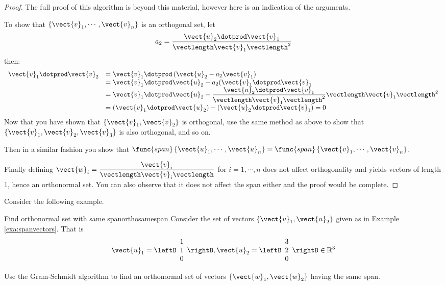 \begin{proof}
The full proof of this algorithm is beyond this material, however here is an indication of the arguments. 

To show that  $\left\{ \vect{v}_1,\cdots , \vect{v}_n  \right\} $ is an orthogonal set, let 
\[ a_2 =  \dfrac{ \vect{u}_2 \dotprod \vect{v}_1}{\vectlength \vect{v}_1 \vectlength^2} \]
then: 
\[
\begin{array}{ll}
 \vect{v}_1 \dotprod \vect{v}_2 &  =  \vect{v}_1 \dotprod \left( \vect{u}_2 - a_2 \vect{v}_1 \right)  \\
 & = \vect{v}_1 \dotprod \vect{u}_2 - a_2 (\vect{v}_1 \dotprod \vect{v}_1  \\
 & = \vect{v}_1 \dotprod \vect{u}_2 - \dfrac{ \vect{u}_2 \dotprod \vect{v}_1}{\vectlength \vect{v}_1 \vectlength^2} \vectlength \vect{v}_1 \vectlength^2 \\
 & = ( \vect{v}_1 \dotprod \vect{u}_2 ) - ( \vect{u}_2 \dotprod \vect{v}_1 ) =0\\
\end{array}
\]
Now that you have shown that $\{ \vect{v}_1, \vect{v}_2\}$ is orthogonal,  use the same method as above to show that 
$\{ \vect{v}_1, \vect{v}_2, \vect{v}_3\}$ is also orthogonal,  and so on. 

Then in a similar fashion you show that $\func{span}\left\{
\vect{u}_1,\cdots ,\vect{u}_n \right\} = \func{span}\left\{
\vect{v}_1,\cdots ,\vect{v}_n \right\}$.

Finally defining $\vect{w}_i =
\dfrac{\vect{v}_i}{\vectlength\vect{v}_i\vectlength}$ for $i=1, \cdots
,n$ does not affect orthogonality and yields vectors of length 1,
hence an orthonormal set. You can also observe that it does not affect
the span either and the proof would be complete.
\end{proof}

Consider the following example.

\begin{example}{Find orthonormal set with same span}{orthosamespan}
Consider the set of vectors $\{\vect{u}_1, \vect{u}_2\}$ given as in Example \ref{exa:spanvectors}. That is  
\[
\vect{u}_1=\leftB 
\begin{array}{r}
1 \\
1 \\
0
\end{array}
\rightB, \vect{u}_2=\leftB 
\begin{array}{r}
3 \\
2 \\
0
\end{array}
\rightB \in \mathbb{R}^{3} 
\]

Use the Gram-Schmidt algorithm to find an orthonormal set of vectors $\{\vect{w}_1, \vect{w}_2\}$ having the same span.
\end{example}


